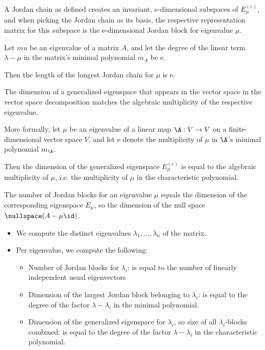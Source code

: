 \begin{theorem}
    A Jordan chain as defined creates an invariant, e-dimensional subspaces of
    $E_\mu^{(e)}$, and when picking the Jordan chain as its basis, the
    respective representation matrix for this subspace is the e-dimensional
    Jordan block for eigenvalue $\mu$.
\end{theorem}


\begin{theorem}
    Let $mu$ be an eigenvalue of a matrix $A$, and let the degree of the linear
    term $\lambda - \mu$ in the matrix's minimal polynomial $m_A$ be e.

    Then the length of the longest Jordan chain for $\mu$ is e.
\end{theorem}

\begin{theorem}
    The dimension of a generalized eigenspace that appears in the vector space
    in the vector space decomposition matches the algebraic multiplicity of the
    respective eigenvalue.

    More formally, let $\mu$ be an eigenvalue of a linear map $\A: V \to V$ on
    a finite-dimensional vector space $V$, and let e denote the multiplicity of
    $\mu$ in $\A$'s  minimal polynomial $m_\A$.

    Then the dimension of the generalized eigenspace $E_\mu^{(e)}$ is equal to 
    the algebraic multiplicity of $\mu$, i.e. the multiplicity of $\mu$ in the 
    characteristic polynomial.
\end{theorem}

\begin{theorem}
    The number of Jordan blocks for an eigenvalue $\mu$ equals the dimension of
    the corresponding eigenspace $E_\mu$, so the dimension of the null space
    $\nullspace(A - \mu\id)$.
\end{theorem}

\begin{remark} [Takeaway]
    \begin{itemize}
        \item We compute the distinct eigenvalues $\lambda_1,\dots,\lambda_n$ of
            the matrix.
        \item Per eigenvalue, we compute the following:
            \begin{itemize}
                \item Number of Jordan blocks for $\lambda_i$: is equal to the 
                    number of linearly independent usual eigenvectors
                \item Dimension of the largest Jordan block belonging to $\lambda_i$:
                    is equal to the degree of the factor $\lambda-\lambda_i$ in the
                    minimal polynomial.
                \item Dimension of the generalized eigenspace for $\lambda_i$, so
                    size of all $\lambda_i$-blocks combined: is equal to the degree
                    of the factor $\lambda-\lambda_i$ in the characteristic polynomial.
            \end{itemize}
    \end{itemize}
\end{remark}
